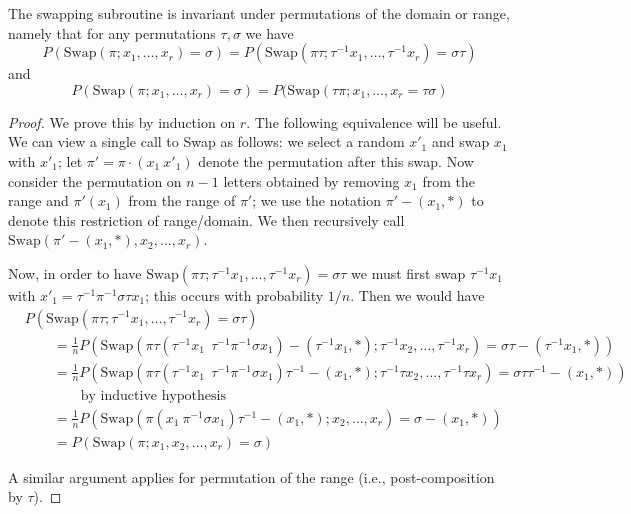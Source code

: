 \begin{proposition}
\label{swap-invariant-prop}
The swapping subroutine is invariant under permutations of the domain or range, namely that for any permutations $\tau, \sigma$ we have
$$
P(\text{Swap}(\pi; x_1, \dots, x_r) = \sigma) = P(\text{Swap}(\pi \tau; \tau^{-1} x_1 , \dots, \tau^{-1} x_r) = \sigma \tau)
$$
and
$$
P(\text{Swap}( \pi; x_1, \dots, x_r) =  \sigma) = P(\text{Swap}(\tau \pi; x_1, \dots, x_r = \tau \sigma)
$$
\end{proposition}
\begin{proof}
We prove this by induction on $r$. The following equivalence will be useful. We can view a single call to Swap as follows: we select a random $x'_1$ and swap $x_1$ with $x'_1$; let $\pi' = \pi \cdot (x_1 \ x'_1) $ denote the permutation after this swap. Now consider the permutation on $n-1$ letters obtained by removing $x_1$ from the range and $\pi'(x_1)$ from the range of $\pi'$; we use the notation $\pi' - (x_1, *)$ to denote this restriction of range/domain. We then recursively call $\text{Swap}(\pi' - (x_1, *), x_2, \dots, x_r)$. 

Now, in order to have $\text{Swap}( \pi \tau; \tau^{-1} x_1, \dots, \tau^{-1} x_r) = \sigma \tau$ we must first swap $\tau^{-1} x_1$ with $x'_1 = \tau^{-1} \pi^{-1} \sigma \tau x_1 $; this occurs with probability $1/n$. Then we would have
\begin{align*}
&P(\text{Swap}( \pi \tau; \tau^{-1} x_1, \dots, \tau^{-1} x_r) =  \sigma \tau)  \\
&\qquad = \tfrac{1}{n} P(\text{Swap}( \pi \tau (\tau^{-1} x_1 \ \ \tau^{-1} \pi^{-1} \sigma x_1 )  - (\tau^{-1} x_1, *); \tau^{-1} x_2, \dots,  \tau^{-1} x_r) = \sigma \tau - (\tau^{-1} x_1, *) ) \\
&\qquad = \tfrac{1}{n} P(\text{Swap}( \pi \tau (\tau^{-1} x_1 \ \ \tau^{-1} \pi^{-1} \sigma x_1 ) \tau^{-1} - (x_1, *); \tau^{-1} \tau x_2, \dots,  \tau^{-1} \tau x_r) = \sigma \tau \tau^{-1} - (x_1, *) ) \\
&\qquad \qquad \text{by inductive hypothesis} \\
&\qquad = \tfrac{1}{n} P(\text{Swap}( \pi (x_1 \ \pi^{-1} \sigma x_1 ) \tau^{-1} - (x_1, *); x_2, \dots,  x_r) = \sigma - (x_1, *) ) \\
&\qquad =  P(\text{Swap}( \pi; x_1, x_2, \dots,  x_r) = \sigma)
\end{align*}

A similar argument applies for permutation of the range (i.e., post-composition by $\tau$).
\end{proof}

